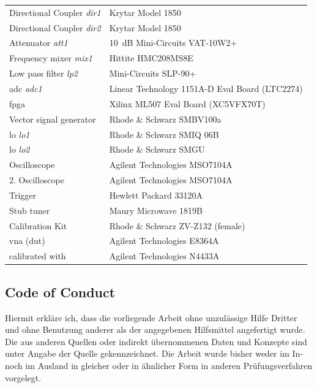 \documentclass[12pt,a4paper,parskip=full,abstract=true,BCOR=12mm,twoside,open=right]{scrreprt}
\def\device#1{\mbox{\textit{#1}}}
\begin{document}
\begin{longtable}{ll}
    Directional Coupler \device{dir1} & Krytar Model 1850\\
    Directional Coupler \device{dir2} & Krytar Model 1850\\
    Attenuator \device{att1}          & \SI{10}{\deci\bel} Mini-Circuits VAT-10W2+\\
    Frequency mixer \device{mix1}     & Hittite HMC208MS8E \\
    Low pass filter \device{lp2}      & Mini-Circuits SLP-90+\\
    \gls{adc} \device{adc1}           & Linear Technology 1151A-D Eval Board (LTC2274) \\
    \gls{fpga}                        & Xilinx ML507 Eval Board (XC5VFX70T) \\
    Vector signal generator           & Rhode \& Schwarz SMBV100a \\
    \gls{lo} \device{lo1}             & Rhode \& Schwarz SMIQ 06B \\
    \gls{lo} \device{lo2}             & Rhode \& Schwarz SMGU \\
    Oscilloscope                      & Agilent Technologies MSO7104A \\
    2. Oscilloscope                   & Agilent Technologies MSO7104A \\
    Trigger                           & Hewlett Packard 33120A \\
    Stub tuner                        & Maury Microwave 1819B \\
    Calibration Kit                   & Rhode \& Schwarz ZV-Z132 (female) \\
    \gls{vna} (\gls{dut})             & Agilent Technologies E8364A\\
    \hspace{2em} calibrated with      & Agilent Technologies N4433A\\
\end{longtable}




\begin{otherlanguage}{ngerman}
    \chapter*{Code of Conduct}
    Hiermit erkl\"are ich, dass die vorliegende Arbeit ohne unzul\"assige Hilfe Dritter und ohne Benutzung
    anderer als der angegebenen Hilfsmittel angefertigt wurde. Die aus anderen Quellen oder indirekt
    \"ubernommenen Daten und Konzepte sind unter Angabe der Quelle gekennzeichnet.
    Die Arbeit wurde bisher weder im In- noch im Ausland in gleicher oder in \"ahnlicher Form in anderen
    Pr\"ufungsverfahren vorgelegt.

    \par\noindent\makebox[7cm]{\hrulefill}      \hfill\makebox[5cm]{\hrulefill}%
    \par\noindent{} \hfill{}%
\end{otherlanguage}
\end{document}
